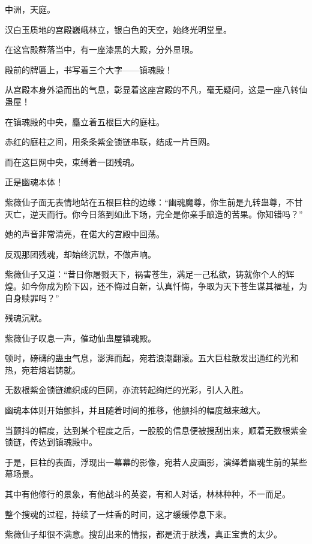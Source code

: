 
\begin{this_body}



中洲，天庭。

汉白玉质地的宫殿巍峨林立，银白色的天空，始终光明堂皇。

在这宫殿群落当中，有一座漆黑的大殿，分外显眼。

殿前的牌匾上，书写着三个大字——镇魂殿！

从宫殿本身外溢而出的气息，彰显着这座宫殿的不凡，毫无疑问，这是一座八转仙蛊屋！

在镇魂殿的中央，矗立着五根巨大的庭柱。

赤红的庭柱之间，用条条紫金锁链串联，结成一片巨网。

而在这巨网中央，束缚着一团残魂。

正是幽魂本体！

紫薇仙子面无表情地站在五根巨柱的边缘：“幽魂魔尊，你生前是九转蛊尊，不甘灭亡，逆天而行。你今日落到如此下场，完全是你亲手酿造的苦果。你知错吗？”

她的声音非常清亮，在偌大的宫殿中回荡。

反观那团残魂，却始终沉默，不做声响。

紫薇仙子又道：“昔日你屠戮天下，祸害苍生，满足一己私欲，铸就你个人的辉煌。如今你成为阶下囚，还不悔过自新，认真忏悔，争取为天下苍生谋其福祉，为自身赎罪吗？”

残魂沉默。

紫薇仙子叹息一声，催动仙蛊屋镇魂殿。

顿时，磅礴的蛊虫气息，澎湃而起，宛若浪潮翻滚。五大巨柱散发出通红的光和热，宛若熔岩铸就。

无数根紫金锁链编织成的巨网，亦流转起绚烂的光彩，引人入胜。

幽魂本体则开始颤抖，并且随着时间的推移，他颤抖的幅度越来越大。

当颤抖的幅度，达到某个程度之后，一股股的信息便被搜刮出来，顺着无数根紫金锁链，传达到镇魂殿中。

于是，巨柱的表面，浮现出一幕幕的影像，宛若人皮画影，演绎着幽魂生前的某些幕场景。

其中有他修行的景象，有他战斗的英姿，有和人对话，林林种种，不一而足。

整个搜魂的过程，持续了一炷香的时间，这才缓缓停息下来。

紫薇仙子却很不满意。搜刮出来的情报，都是流于肤浅，真正宝贵的太少。


\end{this_body}
